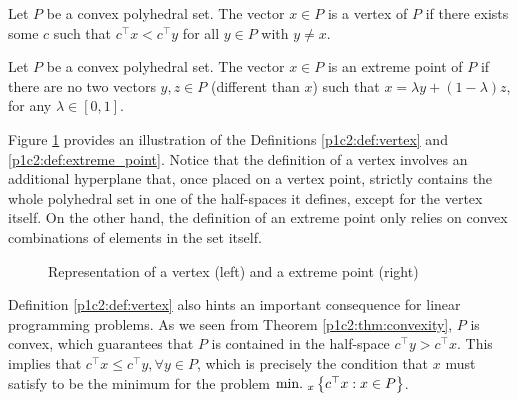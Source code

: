 \begin{definition}[Vertex] \label{p1c2:def:vertex}
	Let $P$ be a convex polyhedral set. The vector $x \in P$ is a vertex of $P$ if there exists some $c$ such that $c^\top x < c^\top y$ for all $y \in P$ with $y \neq x$.
\end{definition}

\begin{definition}\label{p1c2:def:extreme_point}
	Let $P$ be a convex polyhedral set. The vector $x \in P$ is an extreme point of $P$ if there are no two vectors $y,z \in P$ (different than $x$) such that $x = \lambda y + (1 - \lambda)z$, for any $\lambda \in [0,1]$.
\end{definition}

Figure \ref{p1c2:fig:vertex_and_extreme_point} provides an illustration of the Definitions \ref{p1c2:def:vertex} and \ref{p1c2:def:extreme_point}. Notice that the definition of a vertex involves an additional hyperplane that, once placed on a vertex point, strictly contains the whole polyhedral set in one of the half-spaces it defines, except for the vertex itself. On the other hand, the definition of an extreme point only relies on convex combinations of elements in the set itself. 

\begin{figure}
	\caption{Representation of a vertex (left) and a extreme point (right)} \label{p1c2:fig:vertex_and_extreme_point}
\end{figure}	

Definition \ref{p1c2:def:vertex} also hints an important consequence for linear programming problems. As we seen from Theorem \ref{p1c2:thm:convexity}, $P$ is convex, which guarantees that $P$ is contained in the half-space $c^\top y > c^\top x$. This  implies that $c^\top x \leq c^\top y, \forall y \in P$, which is precisely the condition that $x$ must satisfy to be the minimum for the problem $\mathop{\text{min.~}}_x\left\{ c^\top x :x \in P \right \}$.   

